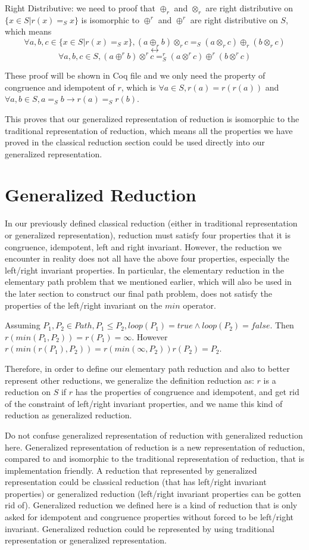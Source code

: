 \documentclass[a4paper,10pt]{article}
\begin{document}
Right Distributive: we need to proof that $\oplus_r$ and $\otimes_r$ are right distributive on $\{x \in S | r(x) =_S x\}$ is isomorphic to $\oplus^r$ and $\oplus^r$ are right distributive on $S$, which means 
\[\forall a,b,c \in \{x \in S | r(x) =_S x \}, (a \oplus_r b) \otimes_r c =_S (a \otimes_r c) \oplus_r (b \otimes_r c) \]
\[\longleftrightarrow \]
\[\forall a,b,c \in S, (a \oplus^r b) \otimes^r c =^r_S (a \otimes^r c) \oplus^r (b \otimes^r c)
\]

These proof will be shown in Coq file and we only need the property of congruence and idempotent of $r$, which is $\forall a \in S, r(a) = r(r(a))$ and $\forall a,b \in S, a =_S b \rightarrow r(a) =_S r(b)$.

This proves that our generalized representation of reduction is isomorphic to the traditional representation of reduction, which means all the properties we have proved in the classical reduction section could be used directly into our generalized representation.

\section{Generalized Reduction}
In our previously defined classical reduction (either in traditional representation or generalized representation), reduction must satisfy four properties that it is congruence, idempotent, left and right invariant. However, the reduction we encounter in reality does not all have the above four properties, especially the left/right invariant properties. In particular, the elementary reduction in the elementary path problem that we mentioned earlier, which will also be used in the later section to construct our final path problem, does not satisfy the properties of the left/right invariant on the $min$ operator. 

Assuming $P_1,P_2 \in Path, P_1 \leq P_2, loop(P_1) = true \wedge loop(P_2) = false$. 
Then $r(min(P_1,P_2)) = r(P_1) = \infty$.
However $r(min(r(P_1),P_2)) = r(min(\infty,P_2)) r(P_2) = P_2$. 

Therefore, in order to define our elementary path reduction and also to better represent other reductions, we generalize the definition reduction as: $r$ is a reduction on $S$ if $r$ has the properties of congruence and idempotent, and get rid of the constraint of left/right invariant properties, and we name this kind of reduction as generalized reduction.

Do not confuse generalized representation of reduction with generalized reduction here. 
Generalized representation of reduction is a new representation of reduction, compared to and isomorphic to the traditional representation of reduction, that is implementation friendly. A reduction that represented by generalized representation could be classical reduction (that has left/right invariant properties) or generalized reduction (left/right invariant properties can be gotten rid of).
Generalized reduction we defined here is a kind of reduction that is only asked for idempotent and congruence properties without forced to be left/right invariant. Generalized reduction could be represented by using traditional representation or generalized representation.
\end{document}
